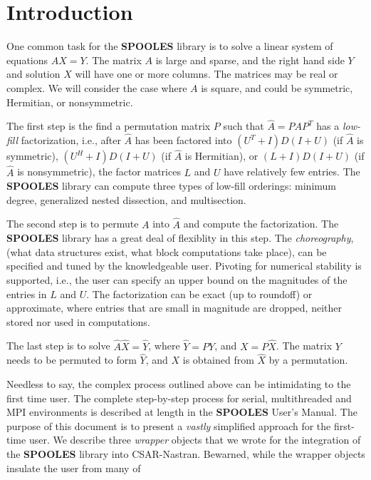 \chapter{Introduction}
\label{chapter:introduction}
\par
One common task for the {\bf SPOOLES} library is to solve a linear
system of equations $AX = Y$.
The matrix $A$ is large and sparse,
and the right hand side $Y$ and solution $X$ will have one or more
columns.
The matrices may be real or complex.
We will consider the case where $A$ is square, and could be
symmetric, Hermitian, or nonsymmetric.
\par
The first step is the find a permutation matrix $P$ such that
$\widehat A = PAP^T$ has a \textit{low-fill} factorization, i.e.,
after $\widehat A$ has been factored into 
$(U^T+I)D(I+U)$ (if $\widehat A$ is symmetric),
$(U^H+I)D(I+U)$ (if $\widehat A$ is Hermitian),
or
$(L+I)D(I+U)$ (if $\widehat A$ is nonsymmetric),
the factor matrices $L$ and $U$ have relatively few entries.
The {\bf SPOOLES} library can compute three types of low-fill
orderings: minimum degree, generalized nested dissection,
and multisection.
\par
The second step is to permute $A$ into $\widehat A$ and compute the
factorization.
The {\bf SPOOLES} library has a great deal of flexiblity in this step.
The \textit{choreography}, (what data structures exist, what block
computations take place), can be specified and tuned by the
knowledgeable user.
Pivoting for numerical stability is supported, i.e.,
the user can specify
an upper bound on the magnitudes of the entries in $L$ and $U$.
The factorization can be exact (up to roundoff) or approximate,
where entries that are small in magnitude are dropped, neither
stored nor used in computations.
\par
The last step is to solve $\widehat A \widehat X = \widehat Y$, where
$\widehat Y = P Y$, and $X = P \widehat X$.
The matrix $Y$ needs to be permuted to form $\widehat Y$,
and $X$ is obtained from $\widehat X$ by a permutation.
\par
Needless to say, the complex process outlined above can be 
intimidating to the first time user.
The complete step-by-step process for serial, multithreaded and MPI
environments is described at length in the {\bf SPOOLES} User's
Manual.
The purpose of this document is to present a {\it vastly} simplified
approach for the first-time user.
We describe three \textit{wrapper} objects that we wrote for the
integration of the {\bf SPOOLES} library into CSAR-Nastran.
Bewarned, while the wrapper objects insulate the user from many of
